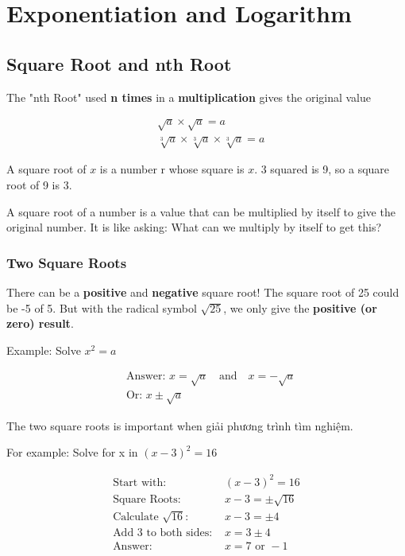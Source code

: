 \chapter{Exponentiation and Logarithm}

\section{Square Root and nth Root}

The "nth Root" used \textbf{n times} in a \textbf{multiplication} gives the original value

\[
  \begin{aligned}
    &\sqrt{a} \times \sqrt{a} = a\\
    &\sqrt[3]{a} \times \sqrt[3]{a} \times \sqrt[3]{a} = a
  \end{aligned}
\]

A square root of $x$ is a number r whose square is $x$. 3 squared is 9, so a square root of 9 is 3.

A square root of a number is a value that can be multiplied by itself to give the original number. It is like asking: What can we multiply by itself to get this?

\subsection{Two Square Roots}

There can be a \textbf{positive} and \textbf{negative} square root! The square root of 25 could be -5 of 5. But with the radical symbol $\sqrt{25}$, we only give the \textbf{positive (or zero) result}.

Example: Solve $x^{2}=a$

\[
  \begin{aligned}
    &\text{Answer: }x = \sqrt{a} \quad \text{and} \quad x = -\sqrt{a}\\
    &\text{Or: } x \pm \sqrt{a}
  \end{aligned}
\]

The two square roots is important when giải phương trình tìm nghiệm. 

For example: Solve for x in $(x-3)^{2}=16$

\[
  \begin{aligned}
    \text{Start with: } &(x-3)^{2}=16\\
    \text{Square Roots: } &x-3= \pm \sqrt{16}\\
    \text{Calculate } \sqrt{16} \text{: } &x-3= \pm4\\
    \text{Add 3 to both sides: } &x=3 \pm 4\\
    \text{Answer: } &x=7 \text{ or } -1
  \end{aligned}
\]

